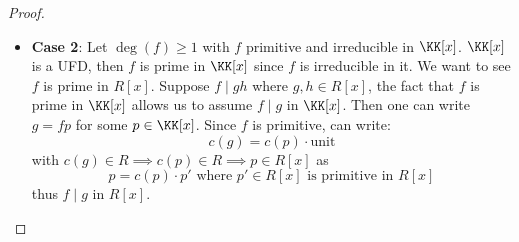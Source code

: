 \begin{proof}
\begin{itemize}
\begin{itemize}
			            UFD, this means \( f \) is prime element in \( R \). Consider the map:
			            \[
				            \begin{aligned}
					            R                  & \to \qo{R}{(f)} \quad \text{domain}               \\
					            \text{gives } R[x] & \to \qo{R}{(f)} [x] \quad \text{surj. ring homo.} \\
					            x                  & \mapsto x
				            \end{aligned}
			            \]
			            where \( \qo{R}{(f)}[x]\) is a domain since \( \qo{R}{(f)} \) is a domain. Now what
			            is the kernel of this ring homomorphism? being \( R[x]f \), see that \( R[x]f \)
			            is prime ideal since \( \qo{R[x]}{R[x]f} \) is a domain by the fact
			            \[
				            \qo{R[x]}{R[x]f} \cong \qo{R}{(f)}[x]
			            \]
			            thus \( f \) is prime
			            element in \( R[x] \).
			      \item \textbf{Case 2}: Let \( \deg(f) \geq 1 \) with \( f \) primitive and
			            irreducible in \( \KK[x] \). \( \KK[x] \) is a UFD, then \( f \) is prime in \(
			            \KK[x] \) since \( f \) is irreducible in it. We want to see \( f \) is prime in
			            \( R[x] \). Suppose \( f \mid gh \) where \( g,h \in R[x] \), the fact that \( f \)
			            is prime in \( \KK[x] \) allows us to assume \( f\mid g \) in \( \KK[x] \). Then
			            one can write \( g = fp \) for some \( p \in \KK[x] \). Since \( f \) is
			            primitive, can write:
			            \[
				            c(g) = c(p) \cdot \text{unit}
			            \]
			            with \( c(g) \in R \implies c(p) \in R \implies p \in R[x] \) as
			            \[
				            p = c(p) \cdot p' \text{ where } p' \in R[x] \text{ is primitive in } R[x]
			            \]
			            thus \( f\mid g \) in \( R[x] \).
		      \end{itemize}
	\end{itemize}
\end{proof}
